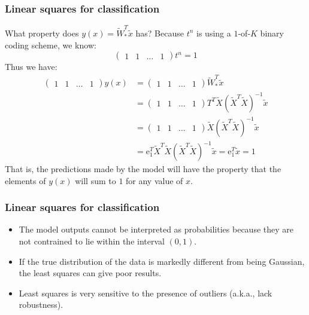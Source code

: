 \documentclass{beamer}
\begin{document}
\begin{frame}
    \frametitle{Linear squares for classification}
    What property does $y(x)=\tilde{W}_{*}^{T}\tilde{x}$ has? Because $t^{n}$ is using a $1$-of-$K$ binary coding scheme, we know:
    \begin{equation*}
        \begin{pmatrix}
            1&1&\hdots&1
        \end{pmatrix}t^{n}=1
    \end{equation*}
    Thus we have:
    \begin{align*}
        \begin{pmatrix}
            1&1&\hdots&1
        \end{pmatrix}y(x)&=
        \begin{pmatrix}
            1&1&\hdots&1
        \end{pmatrix}\tilde{W}_{*}^{T}\tilde{x} \\
        &=\begin{pmatrix}
            1&1&\hdots&1
        \end{pmatrix}T^{T}\tilde{X}(\tilde{X}^T\tilde{X})^{-1}\tilde{x} \\
        &=\begin{pmatrix}
            1&1&\hdots&1
        \end{pmatrix}\tilde{X}(\tilde{X}^T\tilde{X})^{-1}\tilde{x} \\
        &=\mathrm{e}_{1}^{T}\tilde{X}^{T}\tilde{X}(\tilde{X}^{T}\tilde{X})^{-1}\tilde{x}=\mathrm{e}_{1}^{T}\tilde{x}=1
    \end{align*}
    That is, the predictions made by the model will have the property that the elements of $y(x)$ will sum to $1$ for any value of $x$.
\end{frame}

\begin{frame}
    \frametitle{Linear squares for classification}
    \begin{itemize}
        \item The model outputs cannot be interpreted as probabilities because they are not contrained to lie within the interval $(0,1)$.
        \item If the true distribution of the data is markedly different from being Gaussian, the least squares can give poor results.
        \item Least squares is very sensitive to the presence of outliers (a.k.a., lack robustness).
    \end{itemize}
\end{frame}
\end{document}
